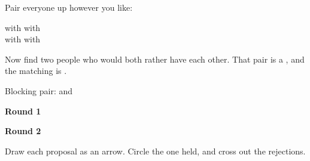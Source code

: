{\large Pair everyone up however you like:}

\vspace{0.5cm}

\begin{center}
{\large
{} \; with \; 
\hspace{2.4cm}
 \; with \; \\[1.3em]
 \; with \; 
\hspace{2.4cm}
 \; with \; }
\end{center}

\vspace{1cm}

{\large Now find two people who would both rather have each other. That pair
is a , and the matching is
.}

\vspace{0.9cm}

{\large Blocking pair:  and }

\newpage
{}

\vspace{0.2cm}

\begin{minipage}[t]{0.48\linewidth}
\begin{center}
{\large\bfseries Round 1}\\[0.4em]
\end{center}
\end{minipage}
\hfill
\begin{minipage}[t]{0.48\linewidth}
\begin{center}
{\large\bfseries Round 2}\\[0.4em]
\end{center}
\end{minipage}

\vspace{0.5cm}

{\small\color{inkgrey} Draw each proposal as an arrow. Circle the one held, and
cross out the rejections.}

